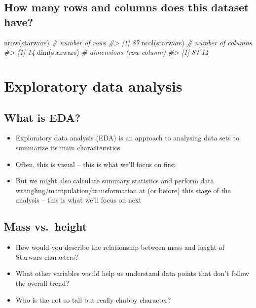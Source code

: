 \documentclass[
]{book}
\newenvironment{Shaded}{\begin{snugshade}}{\end{snugshade}}
\newcommand{\CommentTok}[1]{\textcolor[rgb]{0.56,0.35,0.01}{\textit{#1}}}
\newcommand{\FunctionTok}[1]{\textcolor[rgb]{0.00,0.00,0.00}{#1}}
\newcommand{\NormalTok}[1]{#1}
\providecommand{\tightlist}{%
  \setlength{\itemsep}{0pt}\setlength{\parskip}{0pt}}
\theoremstyle{definition}
\theoremstyle{definition}
\theoremstyle{definition}
\theoremstyle{definition}
\theoremstyle{remark}
\begin{document}
\hypertarget{how-many-rows-and-columns-does-this-dataset-have-1}{%
\section{How many rows and columns does this dataset have?}\label{how-many-rows-and-columns-does-this-dataset-have-1}}

\begin{Shaded}
\begin{Highlighting}[]
\FunctionTok{nrow}\NormalTok{(starwars) }\CommentTok{\# number of rows}
\CommentTok{\#\textgreater{} [1] 87}
\FunctionTok{ncol}\NormalTok{(starwars) }\CommentTok{\# number of columns}
\CommentTok{\#\textgreater{} [1] 14}
\FunctionTok{dim}\NormalTok{(starwars)  }\CommentTok{\# dimensions (row column)}
\CommentTok{\#\textgreater{} [1] 87 14}
\end{Highlighting}
\end{Shaded}

\hypertarget{exploratory-data-analysis-1}{%
\chapter{Exploratory data analysis}\label{exploratory-data-analysis-1}}

\hypertarget{what-is-eda-1}{%
\section{What is EDA?}\label{what-is-eda-1}}

\begin{itemize}
\tightlist
\item
  Exploratory data analysis (EDA) is an approach to analysing data sets to summarize its main characteristics
\item
  Often, this is visual -- this is what we'll focus on first
\item
  But we might also calculate summary statistics and perform data wrangling/manipulation/transformation at (or before) this stage of the analysis -- this is what we'll focus on next
\end{itemize}

\hypertarget{mass-vs.-height-2}{%
\section{Mass vs.~height}\label{mass-vs.-height-2}}

\begin{itemize}
\tightlist
\item
  How would you describe the relationship between mass and height of Starwars characters?
\item
  What other variables would help us understand data points that don't follow the overall trend?
\item
  Who is the not so tall but really chubby character?
\end{itemize}
\end{document}
